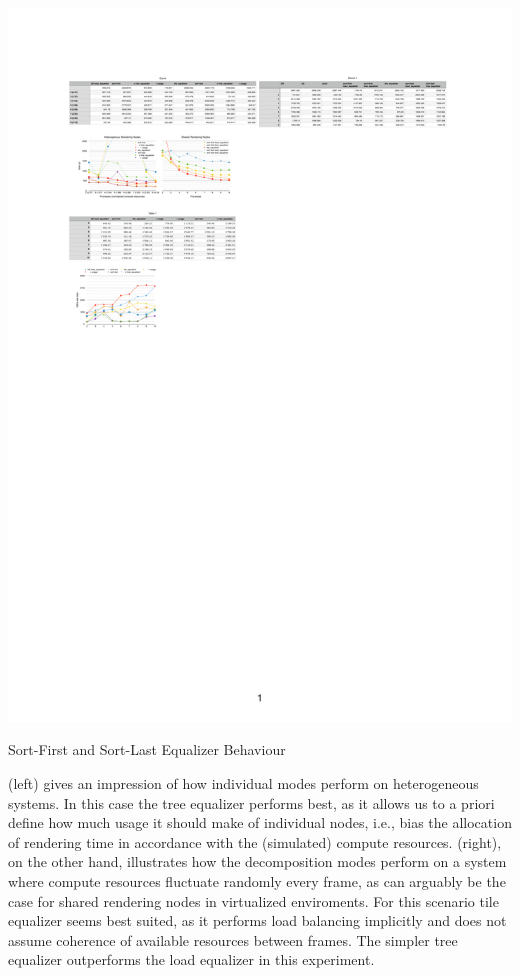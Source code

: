 \begin{benchmark}[h!t]
  \includegraphics[width=\textwidth]{results/equalizers}
  \caption{\label{rEqualizers}Sort-First and Sort-Last Equalizer Behaviour}
\end{benchmark}

 (left) gives an impression of how individual modes perform on
heterogeneous systems. In this case the tree equalizer performs best, as it
allows us to a priori define how much usage it should make of individual nodes,
i.e., bias the allocation of rendering time in accordance with the (simulated)
compute resources.  (right), on the other hand, illustrates
how the decomposition modes perform on a system where compute resources
fluctuate randomly every frame, as can arguably be the case for shared
rendering nodes in virtualized enviroments. For this scenario tile equalizer
seems best suited, as it performs load balancing implicitly and does not assume
coherence of available resources between frames. The simpler tree equalizer
outperforms the load equalizer in this experiment.

